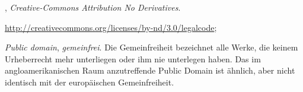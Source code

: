 \begin{description}
\begin{inparadesc}
\end{inparadesc}
\item[CC-BY-ND]
,
\emph{Creative-Commons Attribution No Derivatives}.
\begin{inparadesc}
  \item[Lizenztext (Link):]
  \url{http://creativecommons.org/licenses/by-nd/3.0/legalcode};
  \item[Kurzfassung (ohne Gewähr):]
\end{inparadesc}
\item[PD]
\emph{Public domain}, \emph{gemeinfrei}.
Die Gemeinfreiheit bezeichnet alle Werke, die keinem Urheberrecht mehr unterliegen
oder ihm nie unterlegen haben. Das im angloamerikanischen Raum anzutreffende
Public Domain ist ähnlich, aber nicht identisch mit der europäischen
Gemeinfreiheit.
\end{description}
